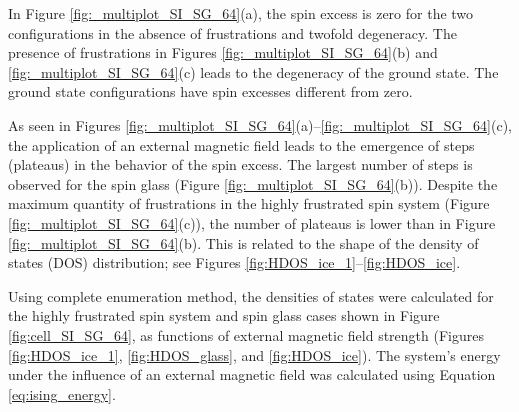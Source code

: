 \documentclass[preprint,12pt]{elsarticle}
\begin{document}
	In Figure \ref{fig:_multiplot_SI_SG_64}(a), the spin excess is zero for the two configurations in the absence of frustrations and twofold degeneracy. The presence of frustrations in Figures \ref{fig:_multiplot_SI_SG_64}(b) and \ref{fig:_multiplot_SI_SG_64}(c) leads to the degeneracy of the ground state. The ground state configurations have spin excesses different from zero.
	
	As seen in Figures \ref{fig:_multiplot_SI_SG_64}(a)--\ref{fig:_multiplot_SI_SG_64}(c), the application of an external magnetic field leads to the emergence of steps (plateaus) in the behavior of the spin excess. The largest number of steps is observed for the spin glass (Figure \ref{fig:_multiplot_SI_SG_64}(b)). Despite the maximum quantity of frustrations in the highly frustrated spin system (Figure \ref{fig:_multiplot_SI_SG_64}(c)), the number of plateaus is lower than in Figure \ref{fig:_multiplot_SI_SG_64}(b). This is related to the shape of the density of states (DOS) distribution; see Figures \ref{fig:HDOS_ice_1}--\ref{fig:HDOS_ice}.
	
	Using complete enumeration method, the densities of states were calculated for the highly frustrated spin system and spin glass cases shown in Figure \ref{fig:cell_SI_SG_64}, as functions of external magnetic field strength (Figures \ref{fig:HDOS_ice_1}, \ref{fig:HDOS_glass}, and \ref{fig:HDOS_ice}).
	The system's energy under the influence of an external magnetic field was calculated using Equation \eqref{eq:ising_energy}.
	
\end{document}
